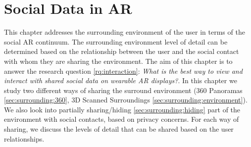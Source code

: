 \chapter{Social Data in AR} %
\label{ch:data} %

This chapter addresses the surrounding environment of the user in terms of the social AR continuum. The surrounding environment level of detail can be determined based on the relationship between the user and the social contact with whom they are sharing the environment. The aim of this chapter is to answer the research question \ref{rq:interaction}: \textit{What is the best way to view and interact with shared social data on wearable AR displays?}. In this chapter we study two different ways of sharing the surround environment (360 Panoramas \ref{sec:surrounding:360}, 3D Scanned Surroundings \ref{sec:surrounding:environment}). We also look into partially sharing/hiding \ref{sec:surrounding:hiding} part of the environment with social contacts, based on privacy concerns. For each way of sharing, we discuss the levels of detail that can be shared based on the user relationships. 





